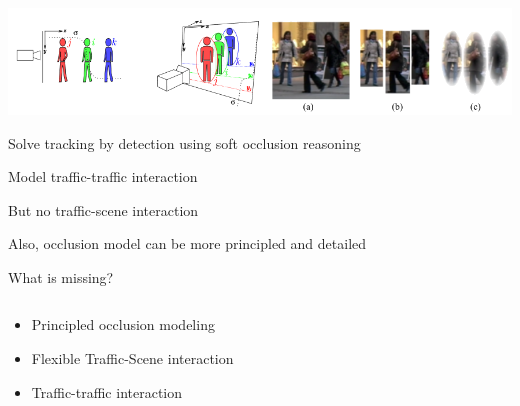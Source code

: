 \begin{frame}{ \cite{Milan_etal_2014}}
  \includegraphics[width=\textwidth]{graphics/milan2014.png}

  Solve tracking by detection using soft occlusion reasoning

  Model traffic-traffic interaction

  \pause
  But no traffic-scene interaction
  
  Also, occlusion model can be more principled and detailed
\end{frame}

\begin{frame}{What is missing?}
  \begin{columns}
    \begin{column}{0.5\textwidth}
      \begin{itemize}
        \item Principled occlusion modeling      
        \item Flexible Traffic-Scene interaction       
        \item Traffic-traffic interaction            
      \end{itemize}
    \end{column}

    \begin{column}{0.5\textwidth}
    \end{column}
  \end{columns}
\end{frame}

